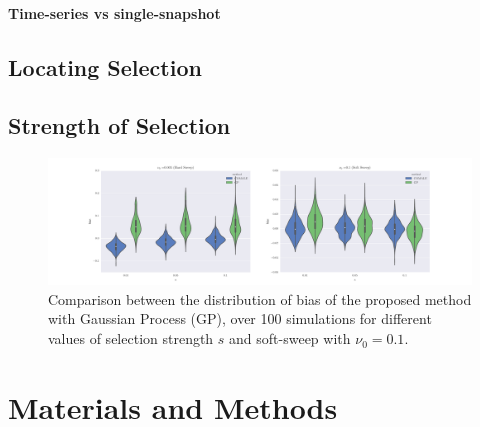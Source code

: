 \documentclass[11pt]{article}
\begin{document}
\paragraph{Time-series vs single-snapshot}

\subsection{Locating Selection}

\subsection{Strength of  Selection}
\begin{figure}
	\centering
	\includegraphics[trim=2.2in 0 2.2in 0, 
	clip,width=\textwidth]{bias}
	\caption{Comparison between the distribution of bias of the proposed method 
	with Gaussian Process (GP), over 100 simulations for different values of 
	selection strength $s$ and soft-sweep with $\nu_0=0.1$.} \label{fig:bias}
\end{figure}

\section{Materials and Methods}
\newpage
\end{document}
